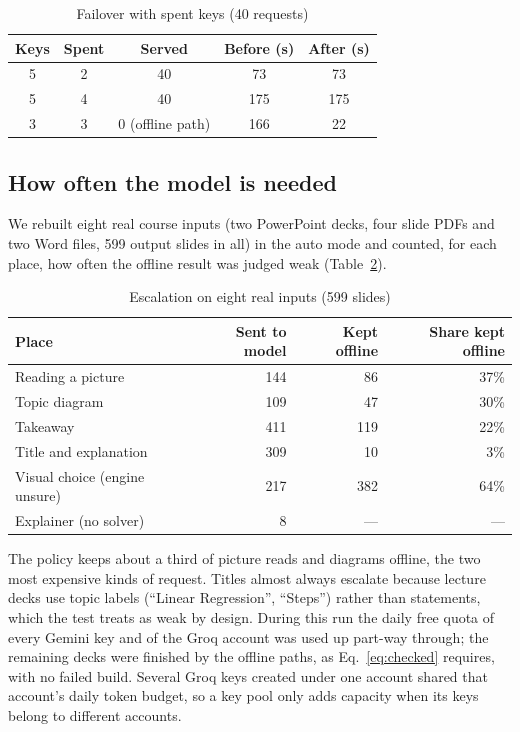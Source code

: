 \documentclass[runningheads]{llncs}
\begin{document}
\begin{table}[H]
\centering
\caption{Failover with spent keys (40 requests)}
\label{tab:fail}
\begin{tabular}{ccccc}
\toprule
Keys & Spent & Served & Before (s) & After (s) \\
\midrule
5 & 2 & 40 & 73 & 73 \\
5 & 4 & 40 & 175 & 175 \\
3 & 3 & 0 (offline path) & 166 & 22 \\
\bottomrule
\end{tabular}
\end{table}

\subsection{How often the model is needed}
We rebuilt eight real course inputs (two PowerPoint decks, four slide PDFs and two Word files, 599 output slides in all) in the
\textsf{auto} mode and counted, for each place, how often the offline result was judged weak (Table~\ref{tab:esc}).

\begin{table}[H]
\centering
\caption{Escalation on eight real inputs (599 slides)}
\label{tab:esc}
\begin{tabular}{lrrr}
\toprule
Place & Sent to model & Kept offline & Share kept offline \\
\midrule
Reading a picture & 144 & 86 & 37\% \\
Topic diagram & 109 & 47 & 30\% \\
Takeaway & 411 & 119 & 22\% \\
Title and explanation & 309 & 10 & 3\% \\
Visual choice (engine unsure) & 217 & 382 & 64\% \\
Explainer (no solver) & 8 & --- & --- \\
\bottomrule
\end{tabular}
\end{table}

The policy keeps about a third of picture reads and diagrams offline, the two most expensive kinds of request. Titles almost
always escalate because lecture decks use topic labels (``Linear Regression'', ``Steps'') rather than statements, which the
test treats as weak by design. During this run the daily free quota of every Gemini key and of the Groq account was used up
part-way through; the remaining decks were finished by the offline paths, as Eq.~\ref{eq:checked} requires, with no failed
build. Several Groq keys created under one account shared that account's daily token budget, so a key pool only adds
capacity when its keys belong to different accounts.
\end{document}
